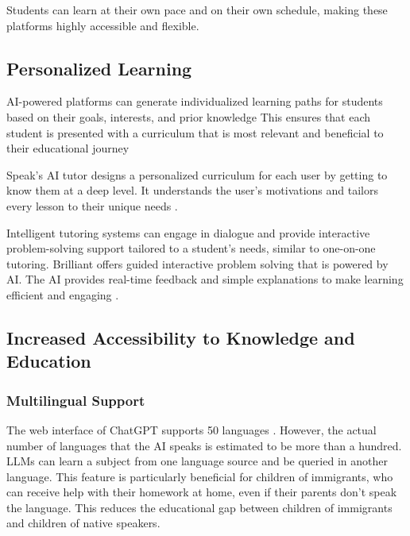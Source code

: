 \documentclass{article}
\begin{document}
Students can learn at their own pace and on their own schedule, making these platforms highly accessible and flexible.

\subsection{Personalized Learning}

AI-powered platforms can generate individualized learning paths for students based on their goals, interests, and prior knowledge
This ensures that each student is presented with a curriculum that is most relevant and beneficial to their educational journey

Speak's AI tutor designs a personalized curriculum for each user by getting to know them at a deep level. It understands the user's motivations and tailors every lesson to their unique needs \cite{https://www.speak.com/}.

Intelligent tutoring systems can engage in dialogue and provide interactive problem-solving support tailored to a student's needs, similar to one-on-one tutoring. Brilliant offers guided interactive problem solving that is powered by AI. The AI provides real-time feedback and simple explanations to make learning efficient and engaging \cite{https://brilliant.org/}.

\subsection{Increased Accessibility to Knowledge and Education}

\subsubsection{Multilingual Support}

The web interface of ChatGPT supports 50 languages \cite{https://help.openai.com/en/articles/8357869-how-to-change-your-language-setting-in-chatgpt}. However, the actual number of languages that the AI speaks is estimated to be more than a hundred. LLMs can learn a subject from one language source and be queried in another language. This feature is particularly beneficial for children of immigrants, who can receive help with their homework at home, even if their parents don't speak the language. This reduces the educational gap between children of immigrants and children of native speakers.
\end{document}

